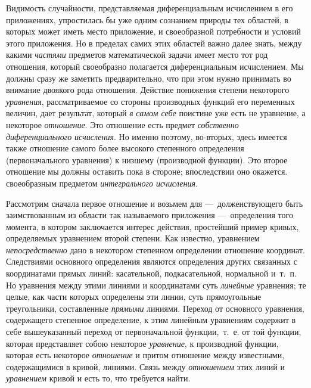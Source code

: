 {Видимость случайности, представляемая диференциальным исчислением в его
приложениях, упростилась бы уже одним сознанием природы тех областей, в
которых может иметь место приложение, и своеобразной потребности и условий
этого приложения. Но в пределах самих этих областей важно далее знать,
между какими {\em частями} предметов математической
задачи имеет место тот род отношения, который своеобразно полагается
диференциальным исчислением. Мы должны сразу же заметить предварительно,
что при этом нужно принимать во внимание двоякого рода отношения. Действие
понижения степени некоторого {\em уравнения},
рассматриваемое со стороны производных функций его переменных величин, дает
результат, который {\em в самом себе} поистине уже есть
не уравнение, а некоторое {\em отношение}. Это
отношение есть предмет {\em собственно
диференциального} {\em исчисления}. Но именно поэтому,
во-вторых, здесь имеется также отношение самого более высокого степенного
определения (первоначального уравнения) к низшему (производной функции).
Это второе отношение мы должны оставить пока в стороне; впоследствии оно
окажется. своеобразным предметом {\em интегрального
исчисления}.

Рассмотрим сначала первое отношение и возьмем для —~долженствующего быть
заимствованным из области так называемого приложения —~определения того
момента, в котором заключается интерес действия, простейший пример кривых,
определяемых уравнением второй степени. Как известно, уравнением
{\em непосредственно} дано в некотором степенном
определении отношение координат. Следствиями основного определения являются
определения других связанных с координатами прямых линий: касательной,
подкасательной, нормальной и~т.~п. Но уравнения между этими линиями и
координатами суть {\em линейные} уравнения; те целые,
как части которых определены эти линии, суть прямоугольные треугольники,
составленные {\em прямыми} линиями. Переход от
основного уравнения, содержащего степенное определение, к этим линейным
уравнениям содержит в себе вышеуказанный переход от первоначальной
функции,~т.~е. от той функции, которая представляет собою некоторое
{\em уравнение}, к производной функции, которая есть
некоторое {\em отношение} и притом отношение между
известными, содержащимися в кривой, линиями. Связь между
{\em отношением} этих линий и
{\em уравнением} кривой и есть то, что требуется найти.

}
